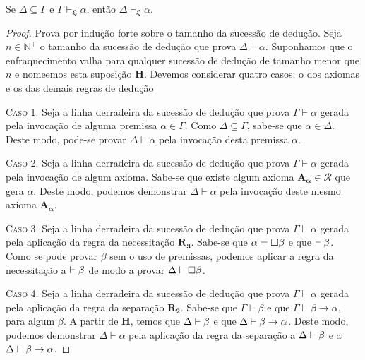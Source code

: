     \begin{tcolorbox}[enhanced jigsaw, breakable, sharp corners, colframe=black, colback=white, boxrule=0.5pt, left=1.5mm, right=1.5mm, top=1.5mm, bottom=1.5mm]
    \begin{theorem}[Enfraquecimento]\label{weakening}
        Se $\Delta\subseteq\Gamma$ e $\Gamma\vdash_{\mathfrak{L}}\alpha$, então $\Delta\vdash_{\mathfrak{L}}\alpha$.
        \begin{proof}
            Prova por indução forte sobre o tamanho da sucessão de dedução.
            Seja $n\in\mathbb{N}^+$ o tamanho da sucessão de dedução que prova $\Delta\vdash\alpha$.
            Suponhamos que o enfraquecimento valha para qualquer sucessão de dedução de tamanho menor que $n$ e nomeemos esta suposição $\mathbf{H}$.
            Devemos considerar quatro casos: o dos axiomas e os das demais regras de dedução

            \vspace{0.5\baselineskip}
            \textsc{Caso 1.}
            Seja a linha derradeira da sucessão de dedução que prova $\Gamma\vdash\alpha$ gerada pela invocação de alguma premissa $\alpha\in\Gamma$.
            Como $\Delta\subseteq\Gamma$, sabe-se que $\alpha\in\Delta$.
            Deste modo, pode-se provar $\Delta\vdash\alpha$ pela invocação desta premissa $\alpha$.

            \vspace{.5\baselineskip}
            \textsc{Caso 2.}
            Seja a linha derradeira da sucessão de dedução que prova $\Gamma\vdash\alpha$ gerada pela invocação de algum axioma.
            Sabe-se que existe algum axioma $\mathbf{A_\alpha}\in\mathcal{R}$ que gera $\alpha$.
            Deste modo, podemos demonstrar $\Delta\vdash\alpha$ pela invocação deste mesmo axioma $\mathbf{A_\alpha}$.

            \vspace{.5\baselineskip}
            \textsc{Caso 3.}
            Seja a linha derradeira da sucessão de dedução que prova $\Gamma\vdash\alpha$ gerada pela aplicação da regra da necessitação \hyperref[modal.rule.3]{$\mathbf{R_3}$}.
            Sabe-se que $\alpha=\Box\beta$ e que ${\mathrel{\vdash}\beta}$.
            Como se pode provar $\beta$ sem o uso de premissas, podemos aplicar a regra da necessitação a ${\mathrel{\vdash}\beta}$ de modo a provar ${\Delta\mathrel{\vdash}\Box\beta}$.

            \vspace{.5\baselineskip}
            \textsc{Caso 4.}
            Seja a linha derradeira da sucessão de dedução que prova $\Gamma\vdash\alpha$ gerada pela aplicação da regra da separação \hyperref[modal.rule.2]{$\mathbf{R_2}$}.
            Sabe-se que $\Gamma\vdash\beta$ e que $\Gamma\vdash\beta\to\alpha$, para algum $\beta$.
            A partir de $\mathbf{H}$, temos que $\Delta\mathrel{\vdash}\beta$ e que $\Delta\mathrel{\vdash}\beta\to\alpha$.
            Deste modo, podemos demonstrar $\Delta\vdash\alpha$ pela aplicação da regra da separação a $\Delta\mathrel{\vdash}\beta$ e a $\Delta\mathrel{\vdash}\beta\to\alpha$.


\end{proof}
\end{theorem}
\end{tcolorbox}
